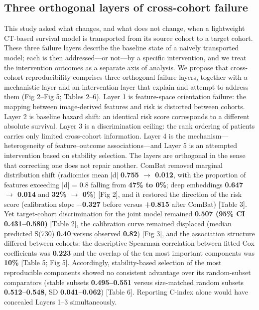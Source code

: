 \documentclass[a4paper,fleqn]{cas-sc}
\begin{document}
\subsection{Three orthogonal layers of cross-cohort failure}

This study asked what changes, and what does not change, when a lightweight CT-based survival model is transported from its source cohort to a target cohort. These three failure layers describe the baseline state of a naively transported model; each is then addressed---or not---by a specific intervention, and we treat the intervention outcomes as a separate axis of analysis. We propose that cross-cohort reproducibility comprises three orthogonal failure layers, together with a mechanistic layer and an intervention layer that explain and attempt to address them (Fig 2--Fig 5; Tables 2--6). Layer 1 is feature-space orientation failure: the mapping between image-derived features and risk is distorted between cohorts. Layer 2 is baseline hazard shift: an identical risk score corresponds to a different absolute survival. Layer 3 is a discrimination ceiling: the rank ordering of patients carries only limited cross-cohort information. Layer 4 is the mechanism---heterogeneity of feature--outcome associations---and Layer 5 is an attempted intervention based on stability selection. The layers are orthogonal in the sense that correcting one does not repair another. ComBat removed marginal distribution shift (radiomics mean |d| \textbf{0.755 $\rightarrow$ 0.012}, with the proportion of features exceeding |d| = 0.8 falling from \textbf{47\% to 0\%}; deep embeddings \textbf{0.647 $\rightarrow$ 0.014} and \textbf{32\% $\rightarrow$ 0\%}) [Fig 2], and it restored the direction of the risk score (calibration slope \textbf{$-$0.327} before versus \textbf{+0.815} after ComBat) [Table 3]. Yet target-cohort discrimination for the joint model remained \textbf{0.507 (95\% CI 0.431--0.580)} [Table 2], the calibration curve remained displaced (median predicted S(730) \textbf{0.40} versus observed \textbf{0.82}) [Fig 3], and the association structure differed between cohorts: the descriptive Spearman correlation between fitted Cox coefficients was \textbf{0.223} and the overlap of the ten most important components was \textbf{10\%} [Table 5; Fig 5]. Accordingly, stability-based selection of the most reproducible components showed no consistent advantage over its random-subset comparators (stable subsets \textbf{0.495--0.551} versus size-matched random subsets \textbf{0.512--0.548}, SD \textbf{0.041--0.062}) [Table 6]. Reporting C-index alone would have concealed Layers 1--3 simultaneously.
\end{document}
